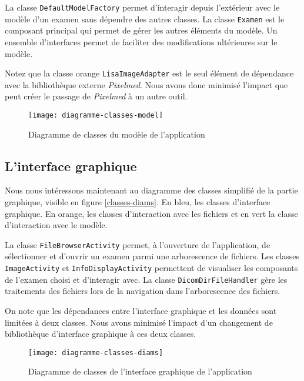 La classe \verb+DefaultModelFactory+ permet d'interagir depuis l'extérieur avec le modèle d'un examen sans dépendre des autres classes.
La classe \verb+Examen+ est le composant principal qui permet de gérer les autres éléments du modèle.
Un ensemble d'interfaces permet de faciliter des modifications ultérieures sur le modèle.

Notez que la classe orange \verb+LisaImageAdapter+ est le seul élément de dépendance avec la bibliothèque externe \emph{Pixelmed}. Nous avons donc minimisé l'impact que peut créer le passage de \emph{Pixelmed} à un autre outil.


\begin{figure}[h]
\begin{center}
    \texttt{[image: diagramme-classes-model]}
\end{center}
    \caption{Diagramme de classes du modèle de l'application}
    \label{classes-model}
\end{figure}

\subsection{L'interface graphique}

Nous nous intéressons maintenant au diagramme des classes simplifié de la partie graphique, visible en figure \vref{classes-diams}. En bleu, les classes d'interface graphique. En orange, les classes d'interaction avec les fichiers et en vert la classe d'interaction avec le modèle.

La classe \verb+FileBrowserActivity+ permet, à l'ouverture de l'application, de sélectionner et d'ouvrir un examen parmi une arborescence de fichiers. Les classes \verb+ImageActivity+ et \verb+InfoDisplayActivity+ permettent de visualiser les composants de l'examen choisi et d'interagir avec.
La classe \verb+DicomDirFileHandler+ gère les traitements des fichiers lors de la navigation dans l'arborescence des fichiers.

On note que les dépendances entre l'interface graphique et les données sont limitées à deux classes. Nous avons minimisé l'impact d'un changement de bibliothèque d'interface graphique à ces deux classes.

\begin{figure}[h]
\begin{center}
    \texttt{[image: diagramme-classes-diams]}
\end{center}
    \caption{Diagramme de classes de l'interface graphique de l'application}
    \label{classes-diams}
\end{figure}

